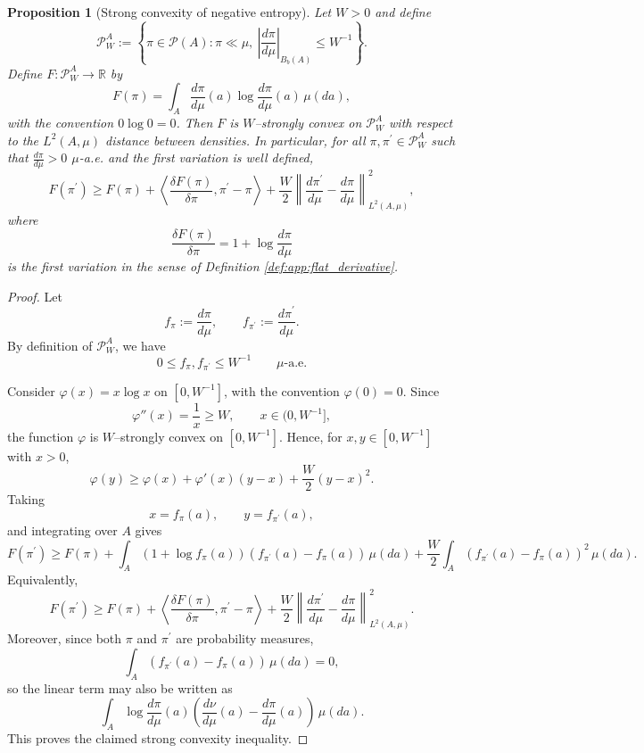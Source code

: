 \documentclass{amsart}
\newtheorem{proposition}{Proposition}
\theoremstyle{definition}
\begin{document}
\begin{proposition}[Strong convexity of negative entropy]
\label{prp:app:Strong_convexity_of_negative_entropy}
Let $W>0$ and define
\[
\mathcal{P}_W^{ A}
:=\left\{
\pi\in\mathcal P( A):
\pi\ll\mu,\ 
\left|\frac{d\pi}{d\mu}\right|_{ B_b(A)}
\le W^{-1}
\right\}.
\]
Define $F:\mathcal{P}_W^{ A}\to\mathbb R$ by
\[
F(\pi)
=
\int_{ A}
\frac{d\pi}{d\mu}(a)
\log \frac{d\pi}{d\mu}(a)\,\mu(da),
\]
with the convention $0\log 0=0$. Then $F$ is $W$--strongly convex on
$\mathcal{P}_W^{ A}$ with respect to the $L^2(A,\mu)$ distance between
densities. In particular, for all $\pi,\pi^\prime\in\mathcal{P}_W^{ A}$ such that
$\frac{d\pi}{d\mu}>0$ $\mu$-a.e. and the first variation is well defined,
\[
F(\pi^\prime)
\ge
F(\pi)
+
\left\langle
\frac{\delta F(\pi)}{\delta \pi},
\pi^\prime-\pi
\right\rangle
+
\frac{W}{2}
\left\|
\frac{d\pi^\prime}{d\mu}
-
\frac{d\pi}{d\mu}
\right\|_{L^2(A,\mu)}^2,
\]
where
\[
\frac{\delta F(\pi)}{\delta \pi}
=
1+\log \frac{d\pi}{d\mu}
\]
is the first variation in the sense of Definition
\ref{def:app:flat_derivative}.
\end{proposition}

\begin{proof}
Let
\[
f_\pi:=\frac{d\pi}{d\mu},
\qquad
f_{\pi^\prime}:=\frac{d\pi^\prime}{d\mu}.
\]
By definition of $\mathcal P_W^{ A}$, we have
\[
0\le f_\pi,f_{\pi^\prime}\le W^{-1}
\qquad \mu\text{-a.e.}
\]

Consider $\varphi(x)=x\log x$ on $[0,W^{-1}]$, with the convention
$\varphi(0)=0$. Since
\[
\varphi''(x)=\frac{1}{x}\ge W,
\qquad x\in(0,W^{-1}],
\]
the function $\varphi$ is $W$--strongly convex on $[0,W^{-1}]$. Hence, for
$x,y\in[0,W^{-1}]$ with $x>0$,
\[
\varphi(y)
\ge
\varphi(x)+\varphi'(x)(y-x)+\frac{W}{2}(y-x)^2.
\]
Taking
\[
x=f_\pi(a),
\qquad
y=f_{\pi^\prime}(a),
\]
and integrating over $ A$ gives
\[
F(\pi^\prime)
\ge
F(\pi)
+
\int_{ A}
\left(
1+\log f_\pi(a)
\right)
\left(
f_{\pi^\prime}(a)-f_\pi(a)
\right)
\,\mu(da)
+
\frac{W}{2}
\int_{ A}
\left(
f_{\pi^\prime}(a)-f_\pi(a)
\right)^2
\,\mu(da).
\]
Equivalently,
\[
F(\pi^\prime)
\ge
F(\pi)
+
\left\langle
\frac{\delta F(\pi)}{\delta \pi},
\pi^\prime-\pi
\right\rangle
+
\frac{W}{2}
\left\|
\frac{d\pi^\prime}{d\mu}
-
\frac{d\pi}{d\mu}
\right\|_{L^2(A,\mu)}^2.
\]
Moreover, since both $\pi$ and $\pi^\prime$ are probability measures,
\[
\int_{ A}
\left(
f_{\pi^\prime}(a)-f_\pi(a)
\right)\,\mu(da)
=0,
\]
so the linear term may also be written as
\[
\int_{ A}
\log \frac{d\pi}{d\mu}(a)
\left(
\frac{d\nu}{d\mu}(a)
-
\frac{d\pi}{d\mu}(a)
\right)
\,\mu(da).
\]
This proves the claimed strong convexity inequality.
\end{proof}
\end{document}
